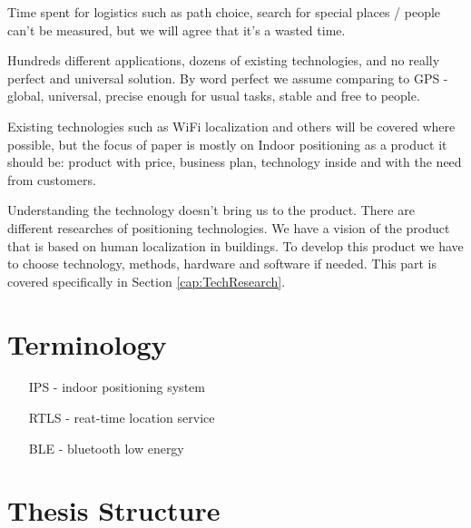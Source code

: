 Time spent for logistics such as path choice, search for special places / people can't be measured, but we will agree that it's a wasted time.

Hundreds different applications, dozens of existing technologies, and no really perfect and universal solution. By word perfect we assume comparing to GPS - global, universal, precise enough for usual tasks, stable and free to people.

Existing technologies such as WiFi localization and others will be covered where possible, but the focus of paper is mostly on Indoor positioning as a product it should be: product with price, business plan, technology inside and with the need from customers.

Understanding the technology doesn't bring us to the product. There are different researches of positioning technologies\cite{Mautz2012IndoorPT, Sakpere2017ASS, Kj_fingerprinting, Brena2017}.
We have a vision of the product that is based on human localization in buildings. To develop this product we have to choose technology, methods, hardware and software if needed.
This part is covered specifically in Section \ref{cap:TechResearch}.

\section*{Terminology}

\begin{enumerate}
	\item [IPS ]- indoor positioning system
	\item [RTLS] - reat-time location service
	\item [BLE] - bluetooth low energy
\end{enumerate}


\section{Thesis Structure}




